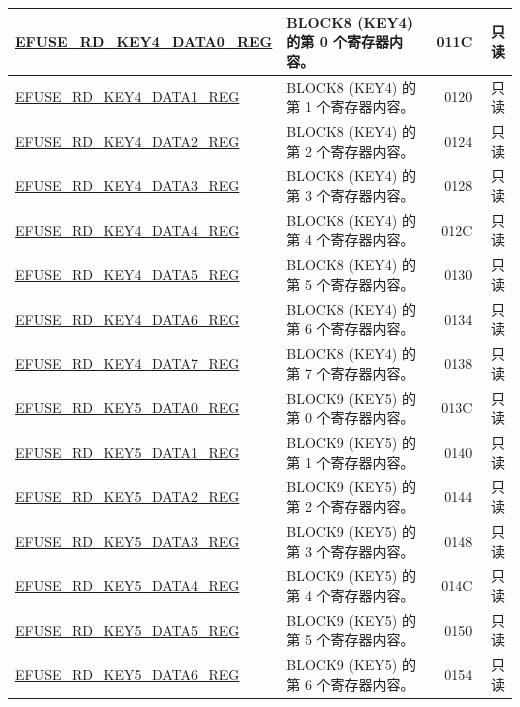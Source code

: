 \begin{longtable}{ | m{6cm} |m{7.2cm} | r| r | }
\hyperref[regdesc:EFUSERDKEY4DATANREG]{EFUSE\_RD\_KEY4\_DATA0\_REG} & BLOCK8 (KEY4) 的第 0 个寄存器内容。 & \hexprefix{}011C & 只读 \\ \hline
\hyperref[regdesc:EFUSERDKEY4DATANREG]{EFUSE\_RD\_KEY4\_DATA1\_REG} & BLOCK8 (KEY4) 的第 1 个寄存器内容。 & \hexprefix{}0120 & 只读 \\ \hline
\hyperref[regdesc:EFUSERDKEY4DATANREG]{EFUSE\_RD\_KEY4\_DATA2\_REG} & BLOCK8 (KEY4) 的第 2 个寄存器内容。 & \hexprefix{}0124 & 只读 \\ \hline
\hyperref[regdesc:EFUSERDKEY4DATANREG]{EFUSE\_RD\_KEY4\_DATA3\_REG} & BLOCK8 (KEY4) 的第 3 个寄存器内容。 & \hexprefix{}0128 & 只读 \\ \hline
\hyperref[regdesc:EFUSERDKEY4DATANREG]{EFUSE\_RD\_KEY4\_DATA4\_REG} & BLOCK8 (KEY4) 的第 4 个寄存器内容。 & \hexprefix{}012C & 只读 \\ \hline
\hyperref[regdesc:EFUSERDKEY4DATANREG]{EFUSE\_RD\_KEY4\_DATA5\_REG} & BLOCK8 (KEY4) 的第 5 个寄存器内容。 & \hexprefix{}0130 & 只读 \\ \hline
\hyperref[regdesc:EFUSERDKEY4DATANREG]{EFUSE\_RD\_KEY4\_DATA6\_REG} & BLOCK8 (KEY4) 的第 6 个寄存器内容。 & \hexprefix{}0134 & 只读 \\ \hline
\hyperref[regdesc:EFUSERDKEY4DATANREG]{EFUSE\_RD\_KEY4\_DATA7\_REG} & BLOCK8 (KEY4) 的第 7 个寄存器内容。 & \hexprefix{}0138 & 只读 \\ \hline
\hyperref[regdesc:EFUSERDKEY5DATANREG]{EFUSE\_RD\_KEY5\_DATA0\_REG} & BLOCK9 (KEY5) 的第 0 个寄存器内容。 & \hexprefix{}013C & 只读 \\ \hline
\hyperref[regdesc:EFUSERDKEY5DATANREG]{EFUSE\_RD\_KEY5\_DATA1\_REG} & BLOCK9 (KEY5) 的第 1 个寄存器内容。 & \hexprefix{}0140 & 只读 \\ \hline
\hyperref[regdesc:EFUSERDKEY5DATANREG]{EFUSE\_RD\_KEY5\_DATA2\_REG} & BLOCK9 (KEY5) 的第 2 个寄存器内容。 & \hexprefix{}0144 & 只读 \\ \hline
\hyperref[regdesc:EFUSERDKEY5DATANREG]{EFUSE\_RD\_KEY5\_DATA3\_REG} & BLOCK9 (KEY5) 的第 3 个寄存器内容。 & \hexprefix{}0148 & 只读 \\ \hline
\hyperref[regdesc:EFUSERDKEY5DATANREG]{EFUSE\_RD\_KEY5\_DATA4\_REG} & BLOCK9 (KEY5) 的第 4 个寄存器内容。 & \hexprefix{}014C & 只读 \\ \hline
\hyperref[regdesc:EFUSERDKEY5DATANREG]{EFUSE\_RD\_KEY5\_DATA5\_REG} & BLOCK9 (KEY5) 的第 5 个寄存器内容。 & \hexprefix{}0150 & 只读 \\ \hline
\hyperref[regdesc:EFUSERDKEY5DATANREG]{EFUSE\_RD\_KEY5\_DATA6\_REG} & BLOCK9 (KEY5) 的第 6 个寄存器内容。 & \hexprefix{}0154 & 只读 \\ \hline

\end{longtable}
